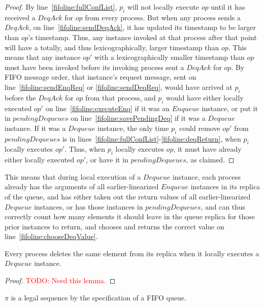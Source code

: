\documentclass[a4paper,anonymous,USenglish]{lipics-v2021} %
\theoremstyle{definition}
\newcommand{\red}[1]{\textcolor{red}{#1}} %
\begin{document}
\begin{proof}
  By line~\ref{fifoline:fullConfList}, $p_i$ will not locally execute $op$ until it has received a $DeqAck$ for $op$ from every process.  But when any process sends a $DeqAck$, on line~\ref{fifoline:sendDeqAck}, it has updated its timestamp to be larger than $op$'s timestamp.  Thus, any instance invoked at that process after that point will have a totally, and thus lexicographically, larger timestamp than $op$.  This means that any instance $op'$ with a lexicographically smaller timestamp than $op$ must have been invoked before its invoking process sent a $DeqAck$ for $op$.  By FIFO message order, that instance's request message, sent on line~\ref{fifoline:sendEnqReq} or \ref{fifoline:sendDeqReq}, would have arrived at $p_i$ before the $DeqAck$ for $op$ from that process, and $p_i$ would have either locally executed $op'$ on line~\ref{fifoline:executeEnq} if it was an $Enqueue$ instance, or put it in $pendingDequeues$ on line~\ref{fifoline:savePendingDeq} if it was a $Dequeue$ instance.  If it was a $Dequeue$ instance, the only time $p_i$ could remove $op'$ from $pendingDequeues$ is in lines~\ref{fifoline:fullConfList}-\ref{fifoline:deqReturn}, when $p_i$ locally executes $op'$.  Thus, when $p_i$ locally executes $op$, it must have already either locally executed $op'$, or have it in $pendingDequeues$, as claimed.
\end{proof}

This means that during local execution of a $Dequeue$ instance, each process already has the arguments of all earlier-linearized $Enqueue$ instances in its replica of the queue, and has either taken out the return values of all earlier-linearized $Dequeue$ instances, or has those instances in $pendingDequeues$, and can thus correctly count how many elements it should leave in the queue replica for those prior instances to return, and chooses and returns the correct value on line~\ref{fifoline:chooseDeqValue}.

\begin{lemma}\label{fifolem:sameDelete}
  Every process deletes the same element from its replica when it locally executes a $Dequeue$ instance.
\end{lemma}

\begin{proof}
\red{TODO: Need this lemma.}
  
\end{proof}

\begin{lemma}\label{fifolem:legal}
  $\pi$ is a legal sequence by the specification of a FIFO queue.
\end{lemma}
\end{document}

